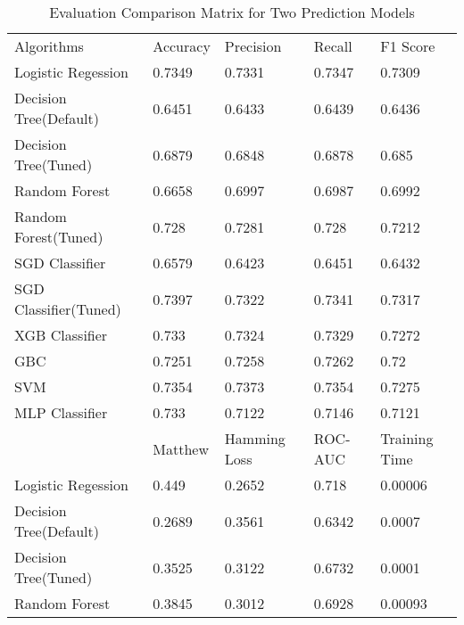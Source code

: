 \begin{table}[H]
\centering
\footnotesize
\caption{Evaluation Comparison Matrix for Two Prediction Models }
\begin{tabular}{lllll}
Algorithms                  & Accuracy             & Precision      & Recall        & F1 Score      \\
Logistic Regession          & 0.7349               & 0.7331         & 0.7347        & 0.7309        \\
Decision Tree(Default)      & 0.6451               & 0.6433         & 0.6439        & 0.6436        \\
Decision Tree(Tuned)        & 0.6879               & 0.6848         & 0.6878        & 0.685         \\
Random Forest               & 0.6658               & 0.6997         & 0.6987        & 0.6992        \\
Random Forest(Tuned)        & 0.728                & 0.7281         & 0.728         & 0.7212        \\
SGD Classifier              & 0.6579               & 0.6423         & 0.6451        & 0.6432        \\
SGD Classifier(Tuned)       & 0.7397               & 0.7322         & 0.7341        & 0.7317        \\
XGB Classifier              & 0.733                & 0.7324         & 0.7329        & 0.7272        \\
GBC                         & 0.7251               & 0.7258         & 0.7262        & 0.72          \\
SVM                         & 0.7354               & 0.7373         & 0.7354        & 0.7275        \\
MLP Classifier              & 0.733                & 0.7122         & 0.7146        & 0.7121        \\
                            & Matthew & Hamming Loss   & ROC-AUC  & Training Time \\
Logistic Regession          & 0.449                & 0.2652         & 0.718         & 0.00006       \\
Decision Tree(Default)      & 0.2689               & 0.3561         & 0.6342        & 0.0007        \\
Decision Tree(Tuned)        & 0.3525               & 0.3122         & 0.6732        & 0.0001        \\
Random Forest               & 0.3845               & 0.3012         & 0.6928        & 0.00093       \\

\end{tabular}
\end{table}
